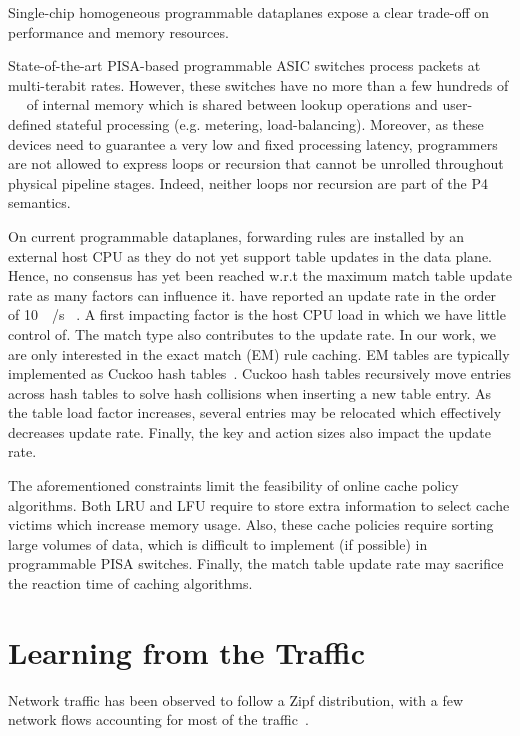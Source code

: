 Single-chip homogeneous programmable dataplanes expose a clear trade-off on performance and memory resources.

State-of-the-art PISA-based programmable ASIC switches process packets at multi-terabit rates.
However, these switches have no more than a few hundreds of \SI{}{\mega\byte} of internal memory which is shared between lookup operations and user-defined stateful processing (e.g. metering, load-balancing).
Moreover, as these devices need to guarantee a very low and fixed processing latency, programmers are not allowed to express loops or recursion that cannot be unrolled throughout physical pipeline stages.
Indeed, neither loops nor recursion are part of the P4 semantics.

On current programmable dataplanes, forwarding rules are installed by an external host CPU as they do not yet support table updates in the data plane.
Hence, no consensus has yet been reached w.r.t the maximum match table update rate as many factors can influence it.
\citeauthor{Jin:2017} have reported an update rate in the order of \SI{10}{\kilo\update/\second}
~\cite{Jin:2017}.
A first impacting factor is the host CPU load in which we have little control of.
The match type also contributes to the update rate.
In our work, we are only interested in the exact match (EM) rule caching. 
EM tables are typically implemented as Cuckoo hash tables~\cite{Kirsch:2009,Bosshart:14}.
Cuckoo hash tables recursively move entries across hash tables to solve hash collisions when inserting a new table entry.
As the table load factor increases, several entries may be relocated which effectively decreases update rate.
Finally, the key and action sizes also impact the update rate.

The aforementioned constraints limit the feasibility of online cache policy algorithms.
Both LRU and LFU require to store extra information to select cache victims which increase memory usage.
Also, these cache policies require sorting large volumes of data, which is difficult to implement (if possible) in programmable PISA switches.
Finally, the match table update rate may sacrifice the reaction time of caching algorithms.

\section{Learning from the Traffic}\label{sec:traffic}

Network traffic has been observed to follow a Zipf distribution, with a few network flows accounting for most of the traffic~\cite{Sarrar:2012, Jin:2017}.

